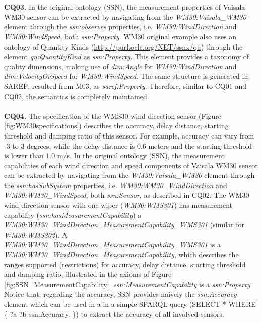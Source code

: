 \documentclass{sig-alternate-05-2015}
\begin{document}
\\\\\textbf{CQ03.} In the original ontology (SSN), the measurement properties of Vaisala WM30 sensor can be extracted by navigating from the \textit{WM30:Vaisala\_WM30} element through the \textit{ssn:observes} properties, i.e. \textit{WM30:WindDirection} and \textit{WM30:WindSpeed}, both \textit{ssn:Property}. WM30 original example also uses an ontology of Quantity Kinds (\url{http://purl.oclc.org/NET/ssnx/qu}) through the element \textit{qu:QuantityKind} as \textit{ssn:Property}. This element provides a taxonomy of quality dimensions, making use of \textit{dim:Angle} for \textit{WM30:WindDirection} and \textit{dim:VelocityOrSpeed} for \textit{WM30:WindSpeed}. The same structure is generated in SAREF, resulted from M03, as \textit{saref:Property}. Therefore, similar to CQ01 and CQ02, the semantics is completely maintained.
\\\\\textbf{CQ04.} The specification of the WMS30 wind direction sensor (Figure \ref{fig:WM30specifications}) describes the accuracy, delay distance, starting threshold and damping ratio of this sensor. For example, accuracy can vary from -3 to 3 degrees, while the delay distance is 0.6 meters and the starting threshold is lower than 1.0 m/s.  
In the original ontology (SSN), the measurement capabilities of each wind direction and speed components  of Vaisala WM30 sensor can be extracted by navigating from the \textit{WM30:Vaisala\_WM30} element through the \textit{ssn:hasSubSystem} properties, i.e. \textit{WM30:WM30\_WindDirection} and \textit{WM30:WM30\_WindSpeed}, both \textit{ssn:Sensor}, as described in CQ02. The WM30 wind direction sensor with one wiper (\textit{WM30:WMS301}) has measurement capability (\textit{ssn:hasMeasurementCapability}) a  \textit{WM30:WM30\_WindDirection\_MeasurementCapability\_WMS301} (similar for \textit{WM30:WMS302}). A \textit{WM30:WM30\_WindDirection\_MeasurementCapability\_WMS301} is a \textit{WM30:WM30\_WindDirection\_MeasurementCapability}, which describes the ranges supported (restrictions) for accuracy, delay distance, starting threshold and damping ratio, illustrated in the axioms of Figure \ref{fig:SSN_MeasurementCapability}. \textit{ssn:MeasurementCapability} is a \textit{ssn:Property}.
Notice that, regarding the accuracy, SSN provides naively the \textit{ssn:Accuracy} element which can be used in a in a simple SPARQL query (SELECT * WHERE \{ ?a ?b ssn:Accuracy. \}) to extract the accuracy of all involved sensors.  
\end{document}
